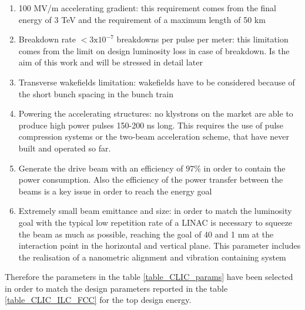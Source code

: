\begin{enumerate}
\item 100 MV/m accelerating gradient: this requirement comes from the final energy of 3 TeV and the requirement of a maximum length of 50 km
\item Breakdown rate $< 3\text{x}10^{-7}$ breakdowns per pulse per meter: this limitation comes from the limit on design luminosity loss in case of breakdown. Is the aim of this work and will be stressed in detail later
\item Transverse wakefields limitation: wakefields have to be considered because of the short bunch spacing in the bunch train
\item Powering the accelerating structures: no klystrons on the market are able to produce high power pulses 150-200 ns long. This requires the use of pulse compression systems or the two-beam acceleration scheme, that have never built and operated so far. 
\item Generate the drive beam with an efficiency of $97 \%$ in order to contain the power consumption. Also the efficiency of the power transfer between the beams is a key issue in order to reach the energy goal
\item Extremely small beam emittance and size: in order to match the luminosity goal with the typical low repetition rate of a LINAC is necessary to squeeze the beam as much as possible, reaching the goal of 40 and 1 nm at the interaction point in the horizontal and vertical plane. This parameter includes the realisation of a nanometric alignment and vibration containing system 
\end{enumerate}





Therefore the parameters in the table \ref{table_CLIC_params} have been selected in order to match the design parameters reported in the table \ref{table_CLIC_ILC_FCC} for the top design energy.


